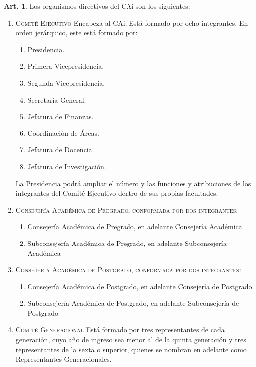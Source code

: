 \documentclass[letterpaper,11pt]{article}
\theoremstyle{definition}%
\newtheorem{art}{Art.} %
\begin{document}
\begin{art}\label{organismosCAi}
	Los organismos directivos del CAi son los siguientes:
	\begin{enumerate}
		\item \label{jerarquia} \textsc{Comité Ejecutivo} Encabeza al CAi. Está formado por ocho integrantes. En orden jerárquico, este está formado por:
		      \begin{enumerate}
			      \item Presidencia.
			      \item Primera Vicepresidencia.
			      \item Segunda Vicepresidencia.
			      \item Secretaría General.
			      \item Jefatura de Finanzas.
			      \item Coordinación de Áreas.
			      \item Jefatura de Docencia.
			      \item Jefatura de Investigación.
		      \end{enumerate}
		      La Presidencia podrá ampliar el número y las funciones y atribuciones de los integrantes del Comité Ejecutivo dentro de sus propias facultades.

		\item \textsc{Consejería Académica de Pregrado, conformada por dos integrantes}:
		      \begin{enumerate}
			      \item Consejería Académica de Pregrado, en adelante Consejería Académica
			      \item Subconsejería Académica de Pregrado, en adelante Subconsejería Académica
		      \end{enumerate}

		\item \textsc{Consejería Académica de Postgrado, conformada por dos integrantes}:
		      \begin{enumerate}
			      \item Consejería Académica de Postgrado, en adelante Consejería de Postgrado
			      \item Subconsejería Académica de Postgrado, en adelante Subconsejería de Postgrado
		      \end{enumerate}

		\item \textsc{Comité Generacional} Está formado por tres representantes de cada generación, cuyo año de ingreso sea menor al de la quinta generación y tres representantes de la sexta o superior, quienes se nombran en adelante como Representantes Generacionales.


\end{enumerate}
\end{art}
\end{document}
